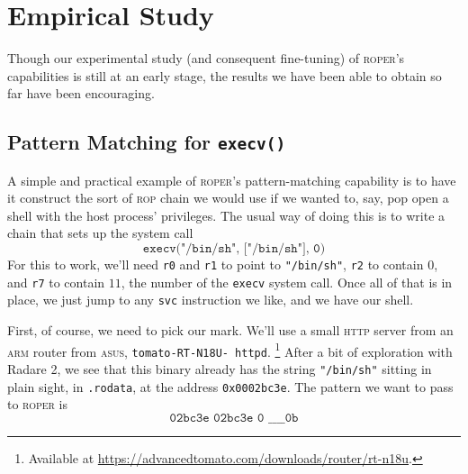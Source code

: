 

\section{Empirical Study}\label{sec:empirical}

Though our experimental study (and consequent fine-tuning) of
\textsc{roper}'s capabilities is still at an early stage, the
results we have been able to obtain so far have been encouraging. 

\subsection{Pattern Matching for \texttt{execv()}}

A simple and practical example of \textsc{roper}'s
pattern-matching capability is to have it construct the sort of
\textsc{rop} chain we would use if we wanted to, say, pop open a
shell with the host process' privileges. The usual way of
doing this is to write a chain that sets up the system call
$$\texttt{execv("/bin/sh", ["/bin/sh"], 0)}$$
For this to work, we'll need \texttt{r0} and \texttt{r1} to point to
\texttt{"/bin/sh"}, \texttt{r2} to contain $0$, and
\texttt{r7} to contain $11$, the number of the \texttt{execv}
system call. Once all of that is in place, we just jump to any
\texttt{svc} instruction we like, and we have our shell.

First, of course, we need to pick our mark. We'll use a small
\textsc{http} server from an  \textsc{arm} router from \textsc{asus},
\texttt{tomato-RT-N18U- httpd}.%
\footnote{Available at
\url{https://advancedtomato.com/downloads/router/rt-n18u}.}
After a bit of exploration with
Radare 2, we see that this binary already has the string
\texttt{"/bin/sh"} sitting in plain sight, in \texttt{.rodata},
at the address \texttt{0x0002bc3e}. The pattern we want to pass to
\textsc{roper} is
$$\texttt{02bc3e 02bc3e 0 \_ \_ \_ \_ 0b}$$

